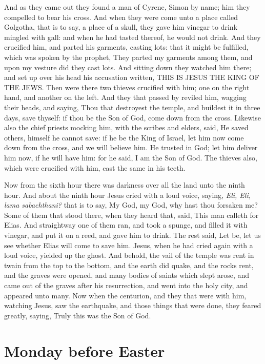 And as they came out they found a man of Cyrene, Simon by name; him they compelled to bear his cross. And when they were come unto a place called Golgotha, that is to say, a place of a skull, they gave him vinegar to drink mingled with gall: and when he had tasted thereof, he would not drink. And they crucified him, and parted his garments, casting lots: that it might be fulfilled, which was spoken by the prophet, They parted my garments among them, and upon my vesture did they cast lots. And sitting down they watched him there; and set up over his head his accusation written, THIS IS JESUS THE KING OF THE JEWS. Then were there two thieves crucified with him; one on the right hand, and another on the left. And they that passed by reviled him, wagging their heads, and saying, Thou that destroyest the temple, and buildest it in three days, save thyself: if thou be the Son of God, come down from the cross. Likewise also the chief priests mocking him, with the scribes and elders, said, He saved others, himself he cannot save: if he be the King of Israel, let him now come down from the cross, and we will believe him. He trusted in God; let him deliver him now, if he will have him: for he said, I am the Son of God. The thieves also, which were crucified with him, cast the same in his teeth.

Now from the sixth hour there was darkness over all the land unto the ninth hour. And about the ninth hour Jesus cried with a loud voice, saying, \emph{Eli, Eli, lama sabachthani?} that is to say, My God, my God, why hast thou forsaken me? Some of them that stood there, when they heard that, said, This man calleth for Elias. And straightway one of them ran, and took a spunge, and filled it with vinegar, and put it on a reed, and gave him to drink. The rest said, Let be, let us see whether Elias will come to save him. Jesus, when he had cried again with a loud voice, yielded up the ghost. And behold, the vail of the temple was rent in twain from the top to the bottom, and the earth did quake, and the rocks rent, and the graves were opened, and many bodies of saints which slept arose, and came out of the graves after his resurrection, and went into the holy city, and appeared unto many. Now when the centurion, and they that were with him, watching Jesus, saw the earthquake, and those things that were done, they feared greatly, saying, Truly this was the Son of God.

\section{Monday before Easter} %
